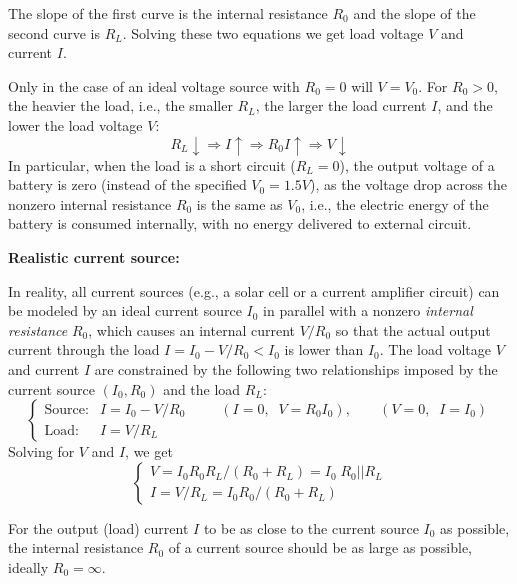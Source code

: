 \documentclass{article}
\begin{document}

The slope of the first curve is the internal resistance $R_0$ and the slope 
of the second curve is $R_L$. Solving these two equations we get load voltage
$V$ and current $I$.

Only in the case of an ideal voltage source with $R_0=0$ will $V=V_0$. 
For $R_0>0$, the heavier the load, i.e., the smaller $R_L$, the larger the 
load current $I$, and the lower the load voltage $V$:
\begin{equation}
  R_L \downarrow \Longrightarrow I \uparrow \Longrightarrow R_0I \uparrow
  \Longrightarrow V \downarrow 
\end{equation}
In particular, when the load is a short circuit ($R_L=0$), the output 
voltage of a battery is zero (instead of the specified $V_0=1.5V$), as 
the voltage drop across the nonzero internal resistance $R_0$ is the same 
as $V_0$, i.e., the electric energy of the battery is consumed internally,
with no energy delivered to external circuit.


{\bf Realistic current source:} 

In reality, all current sources (e.g., a solar cell or a current amplifier
circuit) can be modeled by an ideal current source $I_0$ in parallel with a 
nonzero {\em internal resistance} $R_0$, which causes an internal current 
$V/R_0$ so that the actual output current through the load $I=I_0-V/R_0<I_0$ 
is lower than $I_0$. The load voltage $V$ and current $I$ are constrained by 
the following two relationships imposed by the current source $(I_0, R_0)$ and 
the load $R_L$:
\begin{equation} 
  \left\{ \begin{array}{ll} 
    \mbox{Source:} & I=I_0-V/R_0\;\;\;\;\;\;\;\;\;
    (I=0,\;\;V=R_0I_0),\;\;\;\;\;\;\;(V=0,\;\;I=I_0) \\ 
    \mbox{Load:} & I=V/R_L 
  \end{array} \right.
\end{equation}
Solving for $V$ and $I$, we get
\begin{equation}
  \left\{ \begin{array}{l} V=I_0R_0R_L/(R_0+R_L)=I_0\;R_0||R_L \\
    I=V/R_L=I_0R_0/(R_0+R_L)\end{array} \right.
\end{equation}


For the output (load) current $I$ to be as close to the current source $I_0$
as possible, the internal resistance $R_0$ of a current source should be as
large as possible, ideally $R_0=\infty$.
\end{document}
